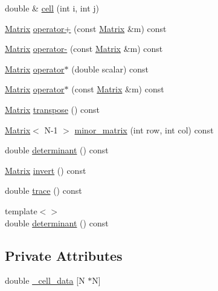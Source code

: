 \begin{DoxyCompactItemize}
\item 
double \& \hyperlink{classimu_1_1Matrix_a2e5d133e189ac2c6b9cd02c1587434bc}{cell} (int i, int j)
\item 
\hyperlink{classimu_1_1Matrix}{Matrix} \hyperlink{classimu_1_1Matrix_aab8526254c59de63d8d5fc070a4f3d66}{operator+} (const \hyperlink{classimu_1_1Matrix}{Matrix} \&m) const 
\item 
\hyperlink{classimu_1_1Matrix}{Matrix} \hyperlink{classimu_1_1Matrix_a83222cfc16dec545c6b6cda58d2cfe5f}{operator-\/} (const \hyperlink{classimu_1_1Matrix}{Matrix} \&m) const 
\item 
\hyperlink{classimu_1_1Matrix}{Matrix} \hyperlink{classimu_1_1Matrix_ad57146483b36392decdc7686f14ebc81}{operator$\ast$} (double scalar) const 
\item 
\hyperlink{classimu_1_1Matrix}{Matrix} \hyperlink{classimu_1_1Matrix_a3a29e72ac4f55faab5d07347bc1073f0}{operator$\ast$} (const \hyperlink{classimu_1_1Matrix}{Matrix} \&m) const 
\item 
\hyperlink{classimu_1_1Matrix}{Matrix} \hyperlink{classimu_1_1Matrix_a2a5f06791fb045e0e0e5d23082c63045}{transpose} () const 
\item 
\hyperlink{classimu_1_1Matrix}{Matrix}$<$ N-\/1 $>$ \hyperlink{classimu_1_1Matrix_a54c5515c94fc8642ae5b8dfa050c8990}{minor\+\_\+matrix} (int row, int col) const 
\item 
double \hyperlink{classimu_1_1Matrix_ac6a728e41ce761ab1b321ffbd44ebd08}{determinant} () const 
\item 
\hyperlink{classimu_1_1Matrix}{Matrix} \hyperlink{classimu_1_1Matrix_a64ddf2c7e3a9a6dda6e87d4b95ec9201}{invert} () const 
\item 
double \hyperlink{classimu_1_1Matrix_abb46783f1d2e8cd542578bc968aff5bf}{trace} () const 
\item 
{\footnotesize template$<$$>$ }\\double \hyperlink{classimu_1_1Matrix_a636a2e6b35d8ffa89d63869d182df66c}{determinant} () const
\end{DoxyCompactItemize}
\subsection*{Private Attributes}
\begin{DoxyCompactItemize}
\item 
double \hyperlink{classimu_1_1Matrix_a54929193dd34fcafcf52bffe95eb0f3c}{\+\_\+cell\+\_\+data} \mbox{[}N $\ast$N\mbox{]}
\end{DoxyCompactItemize}


